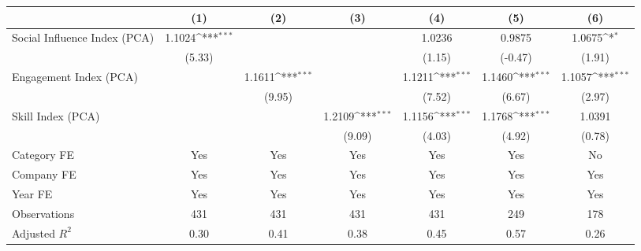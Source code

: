 {
\def\sym#1{\ifmmode^{#1}\else\(^{#1}\)\fi}
\begin{tabular}{l*{6}{c}}
\hline\hline
                                   &\multicolumn{1}{c}{(1)}         &\multicolumn{1}{c}{(2)}         &\multicolumn{1}{c}{(3)}         &\multicolumn{1}{c}{(4)}         &\multicolumn{1}{c}{(5)}         &\multicolumn{1}{c}{(6)}         \\
\hline
Social Influence Index (PCA)       &      1.1024\sym{***}&                     &                     &      1.0236         &      0.9875         &      1.0675\sym{*}  \\
                                   &      (5.33)         &                     &                     &      (1.15)         &     (-0.47)         &      (1.91)         \\
[1em]
Engagement Index (PCA)             &                     &      1.1611\sym{***}&                     &      1.1211\sym{***}&      1.1460\sym{***}&      1.1057\sym{***}\\
                                   &                     &      (9.95)         &                     &      (7.52)         &      (6.67)         &      (2.97)         \\
[1em]
Skill Index (PCA)                  &                     &                     &      1.2109\sym{***}&      1.1156\sym{***}&      1.1768\sym{***}&      1.0391         \\
                                   &                     &                     &      (9.09)         &      (4.03)         &      (4.92)         &      (0.78)         \\
[1em]
Category FE                        &         Yes         &         Yes         &         Yes         &         Yes         &         Yes         &          No         \\
[1em]
Company FE                         &         Yes         &         Yes         &         Yes         &         Yes         &         Yes         &         Yes         \\
[1em]
Year FE                            &         Yes         &         Yes         &         Yes         &         Yes         &         Yes         &         Yes         \\
\hline
Observations                       &         431         &         431         &         431         &         431         &         249         &         178         \\
Adjusted \(R^{2}\)                 &        0.30         &        0.41         &        0.38         &        0.45         &        0.57         &        0.26         \\
\hline\hline
\end{tabular}
}
